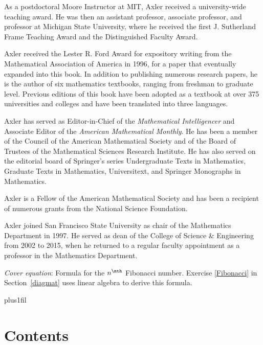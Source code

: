 As a postdoctoral Moore Instructor at MIT, Axler received a university-wide teaching award. He was then an assistant professor, associate professor, and professor at Michigan State University, where he received the first J. Sutherland Frame Teaching Award and the Distinguished Faculty Award.

Axler received the Lester R. Ford Award for expository writing from the Mathematical Association of America in 1996, for a paper that eventually expanded into this book. In addition to publishing numerous research papers, he is the author of six mathematics textbooks, ranging from freshman to graduate level. Previous editions of this book have been adopted as a textbook at over 375 universities and colleges and have been translated into three languages.

Axler has served as Editor-in-Chief of the \textit{Mathematical Intelligencer} and Associate Editor of the \textit{American Mathematical Monthly}. He has been a member of the Council of the American Mathematical Society and of the Board of Trustees of the Mathematical Sciences Research Institute. He has also served on the editorial board of Springer's series Undergraduate Texts in Mathematics, Graduate Texts in Mathematics, Universitext, and Springer Monographs in Mathematics.

Axler is a Fellow of the American Mathematical Society and has been a recipient of numerous grants from the National Science Foundation.

Axler joined San Francisco State University as chair of the Mathematics Department in 1997. He served as dean of the College of Science \& Engineering from 2002 to 2015, when he returned to a regular faculty appointment as a professor in the Mathematics Department.

\smallskip

 \label{0moon}

\medskip

\noindent
\textit{Cover equation}: Formula for the $n^\nth$ Fibonacci number. Exercise \ref{Fibonacci} in Section~\ref{diagmat} uses linear algebra to derive this formula.

{\overfullrule=0in

\parfillskip=14.2bp plus1fil
\chapter{Contents}\tableofcontents}


\endinput 

